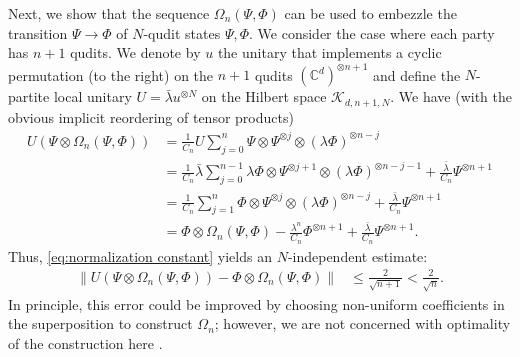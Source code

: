 \documentclass[a4paper, 10pt, onecolumn, accepted=2025-07-22]{quantumarticle}
\theoremstyle{definition}
\newcommand{\norm}[1]{\lVert #1\rVert}
\newcommand{\ox}{\otimes}
\def\CC{{\mathbb C}}
\def\K{{\mathcal K}}
\newcommand*{\1}{\text{\usefont{U}{bbold}{m}{n}1}}
\begin{document}
Next, we show that the sequence $\Omega_n(\Psi,\Phi)$ can be used to embezzle the transition $\Psi\to\Phi$ of $N$-qudit states $\Psi,\Phi$.
We consider the case where each party has $n+1$ qudits.
We denote by $u$ the unitary that implements a cyclic permutation (to the right) on the $n+1$ qudits $(\CC^d)^{\ox n+1}$ and define the $N$-partite local unitary $U = \bar\lambda u^{\otimes N}$ on the Hilbert space $\K_{d,n+1,N}$.
We have (with the obvious implicit reordering of tensor products)
\begin{align} 
    U (\Psi \otimes \Omega_n(\Psi,\Phi)) &= \frac{1}{C_n} U \sum_{j=0}^{n} \Psi\otimes \Psi^{\otimes j} \otimes (\lambda\Phi)^{\otimes n-j} \nonumber\\
    &= \frac{1}{C_n} \bar\lambda\sum_{j=0}^{n-1} \lambda\Phi\otimes \Psi^{\otimes j+1}\otimes (\lambda\Phi)^{\otimes n-j-1} + \frac{\bar\lambda}{C_n} \Psi^{\ox n+1} \nonumber\\
    &= \frac{1}{C_n} \sum_{j=1}^{n} \Phi\otimes\Psi^{\otimes j}\otimes (\lambda\Phi)^{\otimes n-j}+ \frac{\bar\lambda}{C_n} \Psi^{\ox n+1}\nonumber\\
    &= \Phi \otimes \Omega_n(\Psi,\Phi) -\frac{\lambda^n}{C_n} \Phi^{\ox n+1}+\frac{\bar\lambda}{C_n} \Psi^{\ox n+1}.
\end{align}
Thus, \eqref{eq:normalization constant} yields an $N$-independent estimate:
\begin{align}
\label{eq:multipartite-mbz-property}
\norm{U(\Psi\ox\Omega_n(\Psi,\Phi)) - \Phi\ox\Omega_n(\Psi,\Phi)} & \le  \frac{2}{\sqrt{n+1}} < \frac2{\sqrt n}.
\end{align}
In principle, this error could be improved by choosing non-uniform coefficients in the superposition to construct $\Omega_n$; however, we are not concerned with optimality of the construction here \cite{Leung2013coherent}.
\end{document}
